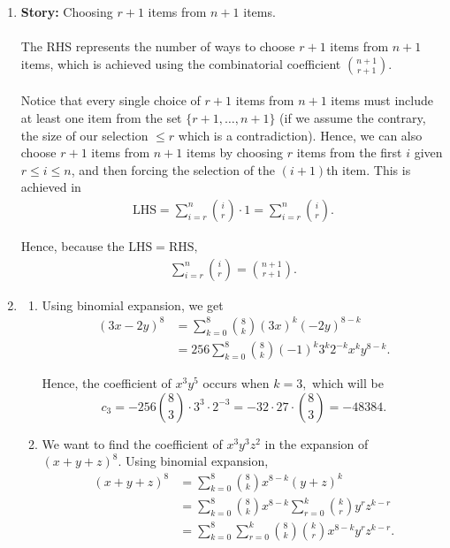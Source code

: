 \documentclass[12pt]{article}
\begin{document}
\begin{enumerate}
  \item \textbf{Story:} Choosing $r + 1$ items from $n + 1$ items.\\ \\
    The RHS represents the number of ways to choose $r + 1$ items
    from $n + 1$ items, which is achieved using the combinatorial
    coefficient ${n + 1 \choose r + 1}.$ \\ \\
    Notice that every single choice of $r + 1$ items from $n + 1$
    items must include at least one item from the set $\{ r + 1,
    \ldots, n + 1 \}$ (if we assume the contrary, the size of our
    selection $\leq r$ which is a contradiction). Hence, we can also
    choose $r + 1$ items from $n + 1$ items by choosing $r$ items
    from the first $i$ given $r \leq i \leq n$, and then forcing the
    selection of the $(i + 1)$th item. This is achieved in
    \begin{align*}
      \text{LHS} = \sum_{i = r}^{n} {i \choose r} \cdot 1 = \sum_{i =
      r}^{n} {i \choose r}.
    \end{align*}

    Hence, because the $\text{LHS} = \text{RHS},$
    \begin{align*}
      \sum_{i = r}^{n} {i \choose r} = {n + 1 \choose r + 1}.
    \end{align*}

  \item
    \begin{enumerate}
      \item Using binomial expansion, we get
        \begin{align*}
          (3x - 2y)^8 &= \sum_{k = 0}^{8} {8 \choose k} (3x)^k (-2y)^{8 - k} \\
          &= 256 \sum_{k = 0}^8 {8 \choose k} (-1)^k 3^k 2^{-k} x^k y^{8 - k}.
        \end{align*}

        Hence, the coefficient of $x^3 y^5$ occurs when $k = 3,$
        which will be $$c_3 = -256 {8 \choose 3}\cdot 3^3 \cdot
        2^{-3} = - 32 \cdot 27 \cdot {8 \choose 3} = -48384.$$

      \item We want to find the coefficient of $x^3y^3z^2$ in the
        expansion of $(x + y + z)^8.$ Using binomial expansion,
        \begin{align*}
          (x + y + z)^8 &= \sum_{k = 0}^8 {8 \choose k} x^{8 - k} (y + z)^k \\
          &= \sum_{k = 0}^8 {8 \choose k} x^{8 - k} \sum_{r = 0}^{k}
          {k \choose r} y^{r} z^{k - r} \\
          &= \sum_{k = 0}^{8} \sum_{r = 0}^{k} {8 \choose k} {k
          \choose r} x^{8 - k} y^{r} z^{k - r}.
        \end{align*}


\end{enumerate}
\end{enumerate}
\end{document}
